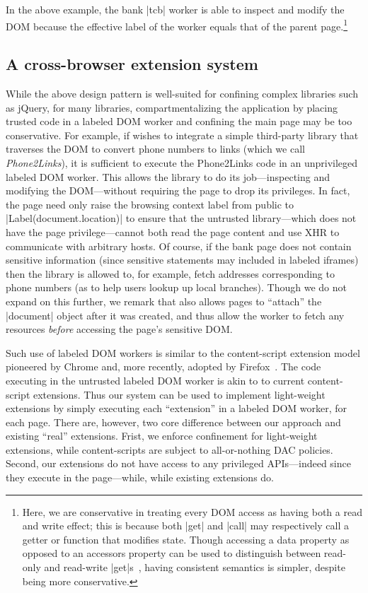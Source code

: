 %
In the above example, the bank \js|tcb| worker is able to inspect and
modify the DOM because the effective label of the worker equals that
of the parent page.\footnote{
%
Here, we are conservative in treating every DOM access as
having both a read and write effect;
%
this is because both \js|get| and \js|call| may respectively call a getter or
function that modifies state.
%
Though accessing a data property as opposed to an accessors property
can be used to distinguish between read-only and read-write
\js|get|s~\cite{ecma}, having consistent semantics is simpler,
despite being more conservative.
}
%


\subsection{A cross-browser extension system}
\label{sec:system:extension}

While the above design pattern is well-suited for confining complex libraries
such as jQuery, for many libraries, compartmentalizing the application by
placing trusted code in a labeled DOM worker and confining the main
page may be too conservative.
%
For example, if  wishes to integrate a simple
third-party library that traverses the DOM to convert phone numbers to
links (which we call \emph{Phone2Links}), it is sufficient to execute
the Phone2Links code in an unprivileged labeled DOM worker.
%
This allows the library to do its job---inspecting and modifying the
DOM---without requiring the page to drop its privileges.
%
In fact, the page need only raise the browsing context label from
public to \js|Label(document.location)| to ensure that the untrusted
library---which does not have the page privilege---cannot both read
the page content and use XHR to communicate with arbitrary hosts.
%
Of course, if the bank page does not contain sensitive information
(since sensitive statements may included in labeled iframes) then the
library is allowed to, for example, fetch addresses corresponding to
phone numbers (as to help users lookup up local branches).
%
Though we do not expand on this further, we remark that \sys{} also
allows pages to ``attach'' the \js|document| object after it was
created, and thus allow the worker to fetch any resources
\emph{before} accessing the page's sensitive DOM.


Such use of labeled DOM workers is similar to the content-script
extension model pioneered by Chrome and, more recently, adopted by
Firefox~\cite{Carlini:2012}.
%
The code executing in the untrusted labeled DOM worker is akin to
to current content-script extensions.
%
Thus our system can be used to implement light-weight extensions by
simply executing each ``extension'' in a labeled DOM worker, for each
page.
%
There are, however, two core difference between our approach and
existing ``real'' extensions.
%
Frist, we enforce confinement for light-weight extensions, while
content-scripts are subject to all-or-nothing DAC policies.
%
Second, our extensions do not have access to any privileged
APIs---indeed since they execute in the page---while, while existing
extensions do.

